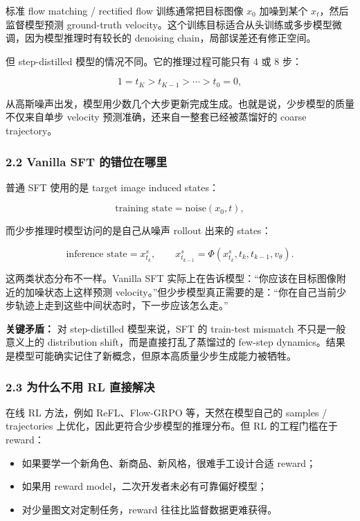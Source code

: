 标准 flow matching / rectified flow 训练通常把目标图像 $x_0$ 加噪到某个 $x_t$，然后监督模型预测 ground-truth velocity。这个训练目标适合从头训练或多步模型微调，因为模型推理时有较长的 denoising chain，局部误差还有修正空间。

但 step-distilled 模型的情况不同。它的推理过程可能只有 4 或 8 步：

\[
1=t_K > t_{K-1} > \cdots > t_0=0,
\]

从高斯噪声出发，模型用少数几个大步更新完成生成。也就是说，少步模型的质量不仅来自单步 velocity 预测准确，还来自一整套已经被蒸馏好的 coarse trajectory。

\subsubsection{2.2 Vanilla SFT 的错位在哪里}

普通 SFT 使用的是 target image induced states：

\[
\text{training state} = \text{noise}(x_0, t),
\]

而少步推理时模型访问的是自己从噪声 rollout 出来的 states：

\[
\text{inference state} = x_{t_k}^{s}, \qquad x_{t_{k-1}}^{s}=\Phi(x_{t_k}^{s}, t_k, t_{k-1}, v_\theta).
\]

这两类状态分布不一样。Vanilla SFT 实际上在告诉模型：“你应该在目标图像附近的加噪状态上这样预测 velocity。”但少步模型真正需要的是：“你在自己当前少步轨迹上走到这些中间状态时，下一步应该怎么走。”

\begin{warnbox}
\textbf{关键矛盾：} 对 step-distilled 模型来说，SFT 的 train-test mismatch 不只是一般意义上的 distribution shift，而是直接打乱了蒸馏过的 few-step dynamics。结果是模型可能确实记住了新概念，但原本高质量少步生成能力被牺牲。
\end{warnbox}

\subsubsection{2.3 为什么不用 RL 直接解决}

在线 RL 方法，例如 ReFL、Flow-GRPO 等，天然在模型自己的 samples / trajectories 上优化，因此更符合少步模型的推理分布。但 RL 的工程门槛在于 reward：

\begin{itemize}[leftmargin=1.5em]
  \item 如果要学一个新角色、新商品、新风格，很难手工设计合适 reward；
  \item 如果用 reward model，二次开发者未必有可靠偏好模型；
  \item 对少量图文对定制任务，reward 往往比监督数据更难获得。
\end{itemize}

